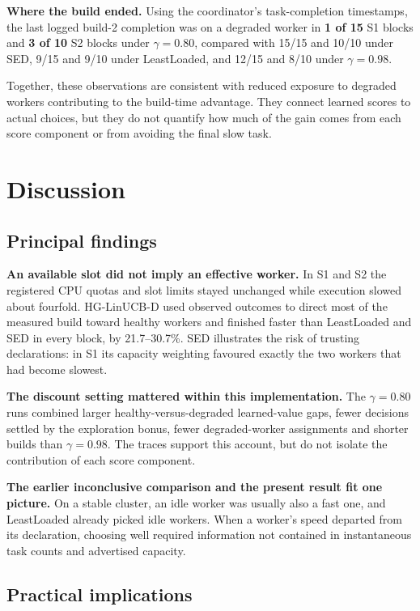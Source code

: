 \documentclass[final,5p,times,twocolumn]{elsarticle}
\begin{document}
\textbf{Where the build ended.} Using the coordinator's task-completion timestamps, the last logged build-2 completion was on a degraded worker in \textbf{1 of 15} S1 blocks and \textbf{3 of 10} S2 blocks under $\gamma=0.80$, compared with 15/15 and 10/10 under SED, 9/15 and 9/10 under LeastLoaded, and 12/15 and 8/10 under $\gamma=0.98$.

Together, these observations are consistent with reduced exposure to degraded workers contributing to the build-time advantage. They connect learned scores to actual choices, but they do not quantify how much of the gain comes from each score component or from avoiding the final slow task.

\section{Discussion}
\label{sec:discussion}

\subsection{Principal findings}

\textbf{An available slot did not imply an effective worker.} In S1 and S2 the registered CPU quotas and slot limits stayed unchanged while execution slowed about fourfold. HG-LinUCB-D used observed outcomes to direct most of the measured build toward healthy workers and finished faster than LeastLoaded and SED in every block, by 21.7--30.7\%. SED illustrates the risk of trusting declarations: in S1 its capacity weighting favoured exactly the two workers that had become slowest.

\textbf{The discount setting mattered within this implementation.} The $\gamma=0.80$ runs combined larger healthy-versus-degraded learned-value gaps, fewer decisions settled by the exploration bonus, fewer degraded-worker assignments and shorter builds than $\gamma=0.98$. The traces support this account, but do not isolate the contribution of each score component.

\textbf{The earlier inconclusive comparison and the present result fit one picture.} On a stable cluster, an idle worker was usually also a fast one, and LeastLoaded already picked idle workers. When a worker's speed departed from its declaration, choosing well required information not contained in instantaneous task counts and advertised capacity.

\subsection{Practical implications}
\end{document}
